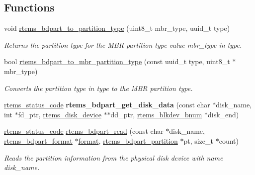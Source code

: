 \subsection*{Functions}
\begin{DoxyCompactItemize}
\item 
void \mbox{\hyperlink{group__rtems__bdpart_ga1620402cb457ec28f7712296fa66c04b}{rtems\+\_\+bdpart\+\_\+to\+\_\+partition\+\_\+type}} (uint8\+\_\+t mbr\+\_\+type, uuid\+\_\+t type)
\begin{DoxyCompactList}\small\item\em Returns the partition type for the M\+BR partition type value {\itshape mbr\+\_\+type} in {\itshape type}. \end{DoxyCompactList}\item 
bool \mbox{\hyperlink{group__rtems__bdpart_ga13ba144439be58871fa6c7e26854f11a}{rtems\+\_\+bdpart\+\_\+to\+\_\+mbr\+\_\+partition\+\_\+type}} (const uuid\+\_\+t type, uint8\+\_\+t $\ast$mbr\+\_\+type)
\begin{DoxyCompactList}\small\item\em Converts the partition type in {\itshape type} to the M\+BR partition type. \end{DoxyCompactList}\item 
\mbox{\label{bdpart-read_8c_a59b7911ed99f103fe6dfa1b07a956925}} 
\mbox{\hyperlink{group__ClassicStatus_ga545d41846817eaba6143d52ee4d9e9fe}{rtems\+\_\+status\+\_\+code}} {\bfseries rtems\+\_\+bdpart\+\_\+get\+\_\+disk\+\_\+data} (const char $\ast$disk\+\_\+name, int $\ast$fd\+\_\+ptr, \mbox{\hyperlink{structrtems__disk__device}{rtems\+\_\+disk\+\_\+device}} $\ast$$\ast$dd\+\_\+ptr, \mbox{\hyperlink{group__rtems__disk_ga5fbcfd40b657bff6c54d9e393fab3274}{rtems\+\_\+blkdev\+\_\+bnum}} $\ast$disk\+\_\+end)
\item 
\mbox{\hyperlink{group__ClassicStatus_ga545d41846817eaba6143d52ee4d9e9fe}{rtems\+\_\+status\+\_\+code}} \mbox{\hyperlink{group__rtems__bdpart_ga1ffdc1b7fc86d324faa9b93500ab0e63}{rtems\+\_\+bdpart\+\_\+read}} (const char $\ast$disk\+\_\+name, \mbox{\hyperlink{unionrtems__bdpart__format}{rtems\+\_\+bdpart\+\_\+format}} $\ast$\mbox{\hyperlink{structformat}{format}}, \mbox{\hyperlink{structrtems__bdpart__partition}{rtems\+\_\+bdpart\+\_\+partition}} $\ast$pt, size\+\_\+t $\ast$count)
\begin{DoxyCompactList}\small\item\em Reads the partition information from the physical disk device with name {\itshape disk\+\_\+name}. \end{DoxyCompactList}\end{DoxyCompactItemize}


